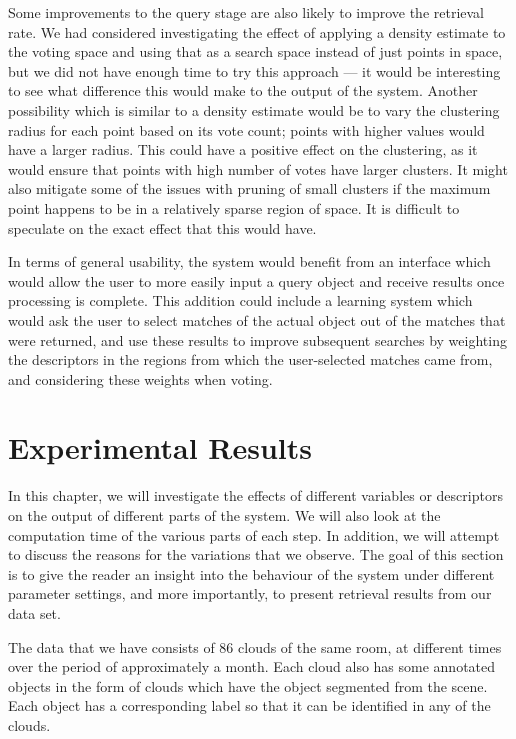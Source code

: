 \documentclass[11pt,a4paper]{kth-mag}
\begin{document}
Some improvements to the query stage are also likely to improve the retrieval
rate. We had considered investigating the effect of applying a density estimate
to the voting space and using that as a search space instead of just points in
space, but we did not have enough time to try this approach --- it would be
interesting to see what difference this would make to the output of the system.
Another possibility which is similar to a density estimate would be to vary the
clustering radius for each point based on its vote count; points with higher
values would have a larger radius. This could have a positive effect on the
clustering, as it would ensure that points with high number of votes have larger
clusters. It might also mitigate some of the issues with pruning of small
clusters if the maximum point happens to be in a relatively sparse region of
space. It is difficult to speculate on the exact effect that this would have. 

In terms of general usability, the system would benefit from an interface which
would allow the user to more easily input a query object and receive results
once processing is complete. This addition could include a learning system which
would ask the user to select matches of the actual object out of the matches
that were returned, and use these results to improve subsequent searches by
weighting the descriptors in the regions from which the user-selected matches
came from, and considering these weights when voting.

\appendix
\chapter{Experimental Results}
\label{chap:exp}
In this chapter, we will investigate the effects of different variables or
descriptors on the output of different parts of the system. We will also look at
the computation time of the various parts of each step. In addition, we will
attempt to discuss the reasons for the variations that we observe. The goal of
this section is to give the reader an insight into the behaviour of the system
under different parameter settings, and more importantly, to present retrieval
results from our data set.

The data that we have consists of 86 clouds of the same room, at different times
over the period of approximately a month. Each cloud also has some annotated
objects in the form of clouds which have the object segmented from the scene.
Each object has a corresponding label so that it can be identified in any of the
clouds.
\end{document}
